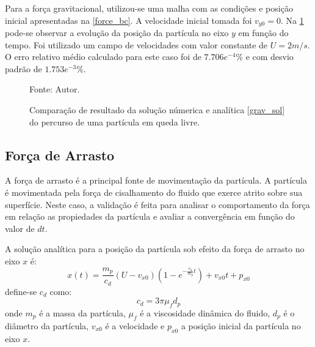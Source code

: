 Para a força gravitacional, utilizou-se uma malha com as condições e posição inicial apresentadas na \ref{force_bc}.
A velocidade inicial tomada foi $v_{y0}=0$.
Na \ref{grav_comp} pode-se observar a evolução da posição da partícula no eixo $y$ em função do tempo.
Foi utilizado um campo de velocidades com valor constante de $U=2m/s$.
O erro relativo médio calculado para este caso foi de $7.706e^{-4}\%$ e com desvio padrão de $1.753e^{-3}\%$.
\begin{figure}[H]
    \centering
     {\raggedleft \scriptsize Fonte: Autor.}
    \caption{Comparação de resultado da solução númerica e analítica \ref{grav_sol} do percurso de uma partícula em queda livre.}
    \label{grav_comp}
\end{figure}

\subsection{\textbf{Força de Arrasto}}
\label{sec_drag}
A força de arrasto é a principal fonte de movimentação da partícula.
A partícula é movimentada pela força de cisalhamento do fluido que exerce atrito sobre sua superfície. 
Neste caso, a validação é feita para analisar o comportamento da força em relação as propiedades da partícula e avaliar a convergência em função do valor de $dt$.

A solução analítica para a posição da partícula sob efeito da força de arrasto no eixo $x$ é:
\begin{equation}
    x(t) = \dfrac{m_p}{c_{d}} (U - v_{x0}) \left(1 - e^{-\frac{c_{d}}{m_p}t}\right) + v_{x0}t + p_{x0}
    \label{drag_sol} 
\end{equation}
define-se $c_{d}$ como:
\begin{equation}
    c_d = 3 \pi \mu_f d_p
    \label{drag_c} 
\end{equation}
onde $m_p$ é a massa da partícula, $\mu_f$ é a viscosidade dinâmica do fluido, $d_p$ é o diâmetro da partícula, $v_{x0}$ é a velocidade e $p_{x0}$ a posição inicial da partícula no eixo $x$.


